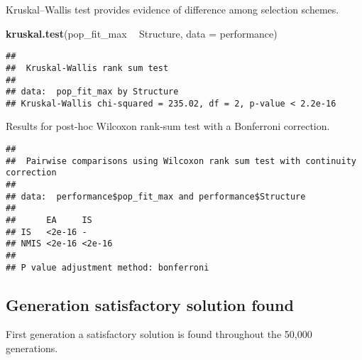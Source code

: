 \documentclass[]{book}
\newenvironment{Shaded}{\begin{snugshade}}{\end{snugshade}}
\newcommand{\DataTypeTok}[1]{\textcolor[rgb]{0.13,0.29,0.53}{#1}}
\newcommand{\KeywordTok}[1]{\textcolor[rgb]{0.13,0.29,0.53}{\textbf{#1}}}
\newcommand{\NormalTok}[1]{#1}
\newcommand{\OperatorTok}[1]{\textcolor[rgb]{0.81,0.36,0.00}{\textbf{#1}}}
\newcommand{\OtherTok}[1]{\textcolor[rgb]{0.56,0.35,0.01}{#1}}
\newcommand{\StringTok}[1]{\textcolor[rgb]{0.31,0.60,0.02}{#1}}
\begin{document}
Kruskal--Wallis test provides evidence of difference among selection schemes.

\begin{Shaded}
\begin{Highlighting}[]
\KeywordTok{kruskal.test}\NormalTok{(pop_fit_max }\OperatorTok{~}\StringTok{ }\NormalTok{Structure, }\DataTypeTok{data =}\NormalTok{ performance)}
\end{Highlighting}
\end{Shaded}

\begin{verbatim}
## 
##  Kruskal-Wallis rank sum test
## 
## data:  pop_fit_max by Structure
## Kruskal-Wallis chi-squared = 235.02, df = 2, p-value < 2.2e-16
\end{verbatim}

Results for post-hoc Wilcoxon rank-sum test with a Bonferroni correction.

\begin{Shaded}
\end{Shaded}

\begin{verbatim}
## 
##  Pairwise comparisons using Wilcoxon rank sum test with continuity correction 
## 
## data:  performance$pop_fit_max and performance$Structure 
## 
##      EA     IS    
## IS   <2e-16 -     
## NMIS <2e-16 <2e-16
## 
## P value adjustment method: bonferroni
\end{verbatim}

\hypertarget{generation-satisfactory-solution-found-5}{%
\subsection{Generation satisfactory solution found}\label{generation-satisfactory-solution-found-5}}

First generation a satisfactory solution is found throughout the 50,000 generations.
\end{document}
